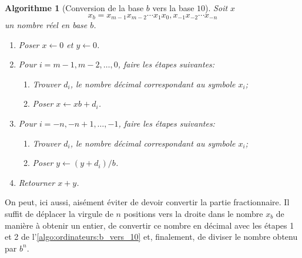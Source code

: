 \documentclass[letterpaper,11pt]{memoir}
\theoremstyle{plain}
\newtheorem{algorithme}{Algorithme}[chapter]
\theoremstyle{definition}
\theoremstyle{remark}
\begin{document}
\begin{algorithme}[Conversion de la base $b$ vers la base $10$]
  \label{algo:ordinateurs:b_vers_10}
  Soit $x$
  \begin{displaymath}
    x_b = x_{m-1}x_{m-2} \cdots x_1x_0,x_{-1}x_{-2} \cdots x_{-n}
  \end{displaymath}
  un nombre réel en base $b$.
  \begin{enumerate}
  \item Poser $x \leftarrow 0$ et $y \leftarrow 0$.
  \item Pour $i = m - 1, m - 2, \dots, 0$, faire les étapes suivantes:
    \begin{enumerate}
    \item Trouver $d_i$, le nombre décimal correspondant au symbole
      $x_i$;
    \item Poser $x \leftarrow x b + d_i$.
    \end{enumerate}
  \item Pour $i = -n, -n + 1, \dots, -1$, faire les étapes suivantes:
    \begin{enumerate}
    \item Trouver $d_i$, le nombre décimal correspondant au symbole
      $x_i$;
    \item Poser $y \leftarrow (y + d_i)/b$.
    \end{enumerate}
  \item Retourner $x + y$.
  \end{enumerate}
\end{algorithme}

On peut, ici aussi, aisément éviter de devoir convertir la partie
fractionnaire. Il suffit de déplacer la virgule de $n$ positions vers
la droite dans le nombre $x_b$ de manière à obtenir un entier, de
convertir ce nombre en décimal avec les étapes 1 et 2 de
l'\autoref{algo:ordinateurs:b_vers_10} et, finalement, de
diviser le nombre obtenu par $b^n$.
\end{document}
